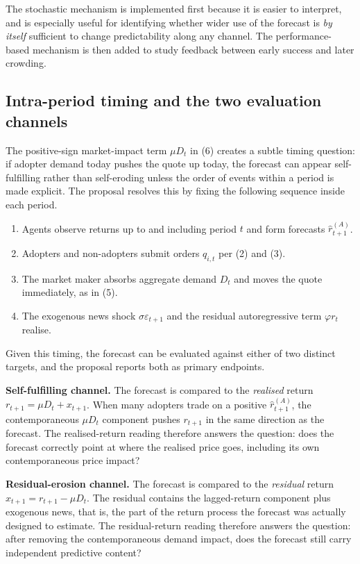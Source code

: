 \documentclass[11pt]{article}
\begin{document}
The stochastic mechanism is implemented first because it is easier to interpret, and is especially useful for identifying whether wider use of the forecast is \emph{by itself} sufficient to change predictability along any channel. The performance-based mechanism is then added to study feedback between early success and later crowding.


\subsection{Intra-period timing and the two evaluation channels}

The positive-sign market-impact term $\mu D_t$ in (6) creates a subtle timing question: if adopter demand today pushes the quote up today, the forecast can appear self-fulfilling rather than self-eroding unless the order of events within a period is made explicit. The proposal resolves this by fixing the following sequence inside each period.

\begin{enumerate}[label=\arabic*., leftmargin=2em, itemsep=0.2em]
  \item Agents observe returns up to and including period $t$ and form forecasts $\hat{r}_{t+1}^{(A)}$.
  \item Adopters and non-adopters submit orders $q_{i,t}$ per (2) and (3).
  \item The market maker absorbs aggregate demand $D_t$ and moves the quote immediately, as in (5).
  \item The exogenous news shock $\sigma \varepsilon_{t+1}$ and the residual autoregressive term $\varphi r_t$ realise.
\end{enumerate}

Given this timing, the forecast can be evaluated against either of two distinct targets, and the proposal reports both as primary endpoints.

\textbf{Self-fulfilling channel.} The forecast is compared to the \emph{realised} return $r_{t+1} = \mu D_t + x_{t+1}$. When many adopters trade on a positive $\hat{r}_{t+1}^{(A)}$, the contemporaneous $\mu D_t$ component pushes $r_{t+1}$ in the same direction as the forecast. The realised-return reading therefore answers the question: does the forecast correctly point at where the realised price goes, including its own contemporaneous price impact?

\textbf{Residual-erosion channel.} The forecast is compared to the \emph{residual} return $x_{t+1} = r_{t+1} - \mu D_t$. The residual contains the lagged-return component plus exogenous news, that is, the part of the return process the forecast was actually designed to estimate. The residual-return reading therefore answers the question: after removing the contemporaneous demand impact, does the forecast still carry independent predictive content?
\end{document}
